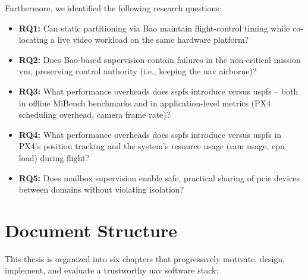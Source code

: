 Furthermore, we identified the following research questions:
\begin{itemize}
  \item \textbf{RQ1:} Can static partitioning via Bao maintain flight-control
        timing while co-locating a live video workload on the same hardware
        platform?
  \item \textbf{RQ2:} Does Bao-based supervision contain failures in the
        non-critical mission \gls{vm}, preserving control authority (i.e., keeping
        the \gls{uav} airborne)?
  \item \textbf{RQ3:} What performance overheads does \gls{sspfs} introduce
        versus \gls{uspfs} -- both in offline MiBench benchmarks and in
        application-level metrics (PX4 scheduling overhead, camera frame rate)?
  \item \textbf{RQ4:} What performance overheads does \gls{sspfs} introduce
        versus \gls{uspfs} in PX4's position tracking and the system's resource
        usage (\gls{ram} usage, \gls{cpu} load) during flight?
  \item \textbf{RQ5:} Does mailbox supervision enable safe, practical sharing of
        \gls{pcie} devices between domains without violating isolation?
\end{itemize}

\section{Document Structure}
\label{sec:doc-structure}
This thesis is organized into six chapters that progressively motivate, design, implement, and evaluate a trustworthy \gls{uav} software stack:

